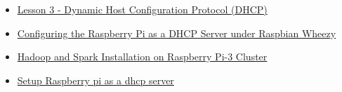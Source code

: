 \begin{itemize}
\item
  \href{https://www.raspberrypi.org/learning/networking-lessons/lesson-3/plan/}{Lesson
  3 - Dynamic Host Configuration Protocol (DHCP)}
  \cite{hid-sp18-405-tutorial-pidhcp-lesson3}
\item
  \href{http://my-music.mine.nu/images/rpi_raspbianwheezy_dhcp_server.pdf}{Configuring
  the Raspberry Pi as a DHCP Server under Raspbian Wheezy}
  \cite{hid-sp18-405-tutorial-pidhcp-pdf}
\item
  \href{https://tekmarathon.com/2017/02/16/hadoop-and-spark-installation-on-raspberry-pi-3-cluster-part-3/}{Hadoop
  and Spark Installation on Raspberry Pi-3 Cluster}
  \cite{hid-sp18-405-tutorial-pidhcp-hadoopinstall}
\item
  \href{https://blog.monotok.org/setup-raspberry-pi-dhcp-server/}{Setup
  Raspberry pi as a dhcp server}
  \cite{hid-sp18-405-tutorial-pidhcp-setup}
\end{itemize}

